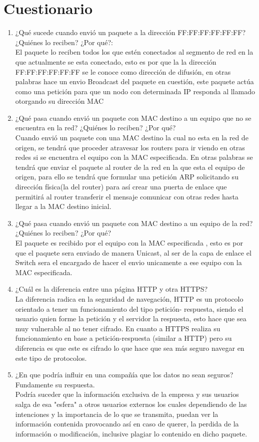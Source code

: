 \documentclass[spanish]{udpreport}
\begin{document}
\chapter{Cuestionario}
\begin{enumerate}
    \item ¿Qué sucede cuando envió un paquete a la dirección FF:FF:FF:FF:FF:FF?¿Quiénes lo reciben? ¿Por qué?:
    \\[0.2 cm] El paquete lo reciben todos los que estén conectados al segmento de red en la que actualmente se esta conectado, esto es por que la  la dirección FF:FF:FF:FF:FF:FF se le conoce como dirección de difusión, en otras palabras hace un envio Broadcast del paquete en cuestión, este paquete actúa como una petición para que un nodo con determinada IP responda al llamado otorgando su dirección MAC
    \item ¿Qué pasa cuando envió un paquete con MAC destino a un equipo que no se encuentra en la red? ¿Quiénes lo reciben? ¿Por qué?
    \\[0.2cm] Cuando envió un paquete con una MAC destino la cual no esta en la red de origen, se tendrá que proceder atravesar los routers para ir viendo en otras redes si se encuentra el equipo con la MAC especificada. En otras palabras se tendrá que enviar el paquete al router de la red en la que esta el equipo de origen, para ello se tendrá que formular una petición ARP solicitando su dirección física(la del router) para así crear una puerta de enlace que permitirá al router transferir el mensaje comunicar con otras redes hasta llegar a la MAC destino inicial.
    \item ¿Qué pasa cuando envió un paquete con MAC destino a un equipo de la red? ¿Quiénes lo reciben? ¿Por qué?
    \\[0.2cm]El paquete es recibido por el equipo con la MAC especificada , esto es por que el paquete sera enviado de manera Unicast, al ser de la capa de enlace el Switch sera el encargado de hacer el envio unicamente a ese equipo con la MAC especificada.
    \item ¿Cuál es la diferencia entre una página HTTP y otra HTTPS?
    \\[0.2cm]La diferencia radica en la seguridad de navegación, HTTP es un protocolo orientado a tener un funcionamiento del tipo petición- respuesta, siendo el usuario quien forme la petición y el servidor la respuesta, esto hace que sea muy vulnerable al no tener cifrado. En cuanto a HTTPS realiza su funcionamiento en base a petición-respuesta (similar a HTTP) pero su diferencia es que este es cifrado lo que hace que sea más seguro navegar en este tipo de protocolos.
    \item ¿En que podría influir en una compañía que los datos no sean seguros? Fundamente su respuesta.
    \\[0.2cm]Podría suceder que la información exclusiva de la empresa y sus usuarios salga de esa "esfera" a otros usuarios externos los cuales dependiendo de las intenciones y la importancia de lo que se transmita, puedan ver la información contenida provocando así en caso de querer, la perdida de la información o modificación, inclusive plagiar lo contenido en dicho paquete.

\end{enumerate}
\newpage
\end{document}
